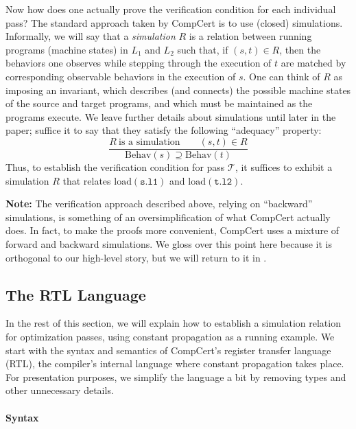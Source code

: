 Now how does one actually prove the verification condition for each individual pass?  The standard
approach taken by CompCert is to use (closed) simulations.  Informally, we will say that a
\emph{simulation} $R$ is a relation between running programs (\ie machine states) in $L_1$ and $L_2$
such that, if $(s,t) \in R$, then the behaviors one observes while stepping through the execution of
$t$ are matched by corresponding observable behaviors in the execution of $s$.  One can think of $R$
as imposing an invariant, which describes (and connects) the possible machine states of the source
and target programs, and which must be maintained as the programs execute.  We leave further details
about simulations until later in the paper; suffice it to say that they satisfy the following
``adequacy'' property:
\[
\frac{
R~\mbox{is a simulation} \qquad
(s,t)\in R
}{
\mathrm{Behav}(s) \supseteq \mathrm{Behav}(t)
}
\]
Thus, to establish the verification condition for pass $\mathcal{T}$, it suffices to exhibit a
simulation $R$ that relates $\mathrm{load}(\mathtt{s.l1})$ and $\mathrm{load}(\mathtt{t.l2})$.

\textbf{Note:} The verification approach described above, relying on ``backward'' simulations, is
something of an oversimplification of what CompCert actually does.  In fact, to make the proofs more
convenient, CompCert uses a mixture of forward and backward simulations.  We gloss over this point
here because it is orthogonal to our high-level story, but we will return to it in
.




\subsection{The RTL Language}
\label{sec:background:rtl}

In the rest of this section, we will explain how to establish a simulation relation for optimization
passes, using constant propagation as a running example.  We start with the syntax and semantics of
CompCert's register transfer language (RTL), the compiler's internal language where constant
propagation takes place.  For presentation purposes, we simplify the language a bit by removing
types and other unnecessary details.


\paragraph{Syntax}

